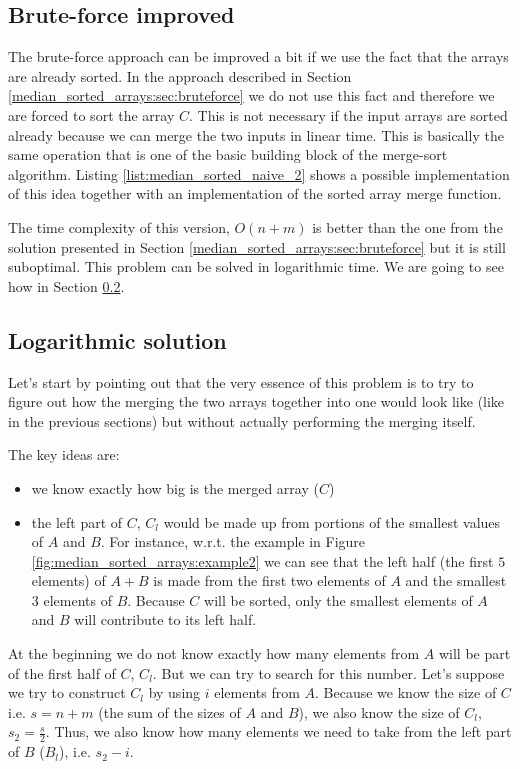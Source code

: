 \subsection{Brute-force improved}
\label{median_sorted_arrays:sec:bruteforce_improved}
The brute-force approach can be improved a bit if we use the fact that the arrays are already sorted. In the approach described in Section \ref{median_sorted_arrays:sec:bruteforce} we do not use this fact and therefore we are forced to sort the array $C$. This is not necessary if the input arrays are sorted already because we can merge the two inputs in linear time. This is basically the same operation that is one of the basic building block of the merge-sort algorithm\cite{wiki:mergesort}. Listing \ref{list:median_sorted_naive_2} shows a possible implementation of this idea together with an implementation of the sorted array merge function. 



The time complexity of this version, $O(n+m)$ is better than the one from the solution presented in Section \ref{median_sorted_arrays:sec:bruteforce} but it is still suboptimal. This problem can be solved in logarithmic time. We are going to see how in Section \ref{median_sorted_arrays:sec:log}.

\subsection{Logarithmic solution}
\label{median_sorted_arrays:sec:log}
Let's start by pointing out that the very essence of this problem is to try to figure out how the merging the two arrays together into one would look like (like in the previous sections) but without actually performing the merging itself.

The key ideas are:
\begin{itemize}
	\item we know exactly how big is the merged array ($C$)
	\item the left part of $C$, $C_l$ would be made up from portions of the smallest values of $A$ and $B$. For instance, w.r.t. the example in Figure \ref{fig:median_sorted_arrays:example2} we can see that the left half (the first $5$ elements) of $A+B$ is made from the first two elements of $A$ and the smallest $3$ elements of $B$. Because $C$ will be sorted, only the smallest elements of $A$ and $B$ will contribute to its left half.
\end{itemize}

At the beginning we do not know exactly how many elements from $A$ will be part of the first half of $C$, $C_l$. But we can try to search for this number. 
Let's suppose we try to construct $C_l$ by using $i$ elements from $A$. Because we know the size of $C$ i.e. $s=n+m$ (the sum of the sizes of $A$ and $B$), we also know the size of $C_l$, $s_2 = \frac{s}{2}$. Thus, we also know how many elements we need to take from the left part of $B$ ($B_l$), i.e. $s_2 - i$.
